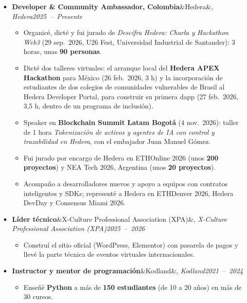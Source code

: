 \documentclass[a4paper,10pt]{article}
\newcommand{\entry}[3]{\textbf{#1}\ifx&#2&\else, \textit{#2}\fi \hfill \mbox{\textit{#3}}}
\begin{document}
\begin{itemize}
    \item \entry{Developer \& Community Ambassador, Colombia}{Hedera}{2025 -- Presente}
        \begin{itemize}
            \item Organicé, dicté y fui jurado de \textit{Descifra Hedera: Charla y Hackathon
                Web3} (29 sep.\ 2026, U26 Fest, Universidad Industrial de Santander): 3 horas,
                unas \textbf{90 personas}.
            \item Dicté dos talleres virtuales: el arranque local del \textbf{Hedera APEX
                Hackathon} para México (26 feb.\ 2026, 3 h) y la incorporación de estudiantes de
                dos colegios de comunidades vulnerables de Brasil al Hedera Developer Portal, para
                construir su primera dapp (27 feb.\ 2026, 3,5 h, dentro de un programa de inclusión).
            \item Speaker en \textbf{Blockchain Summit Latam Bogot\'a} (4 nov.\ 2026): taller de
                1 hora \textit{Tokenización de activos y agentes de IA con control y trazabilidad
                en Hedera}, con el embajador Juan Manuel G\'omez.
            \item Fui jurado por encargo de Hedera en ETHOnline 2026 (unos \textbf{200 proyectos})
                y NEA Tech 2026, Argentina (unos \textbf{20 proyectos}).
            \item Acompaño a desarrolladores nuevos y apoyo a equipos con contratos inteligentes y
                SDKs; representé a Hedera en ETHDenver 2026, Hedera DevDay y Consensus Miami 2026.
        \end{itemize}

    \item \entry{Líder técnico}{X-Culture Professional Association (XPA)}{2025 -- 2026}
        \begin{itemize}
            \item Construí el sitio oficial (WordPress, Elementor) con pasarela de pagos y llevé
                la parte técnica de eventos virtuales internacionales.
        \end{itemize}

    \item \entry{Instructor y mentor de programación}{Kodland}{2021 -- 2024}
        \begin{itemize}
            \item Enseñé \textbf{Python} a más de \textbf{150 estudiantes} (de 10 a 20 años) en más de 30 cursos.
        \end{itemize}
\end{itemize}
\end{document}
